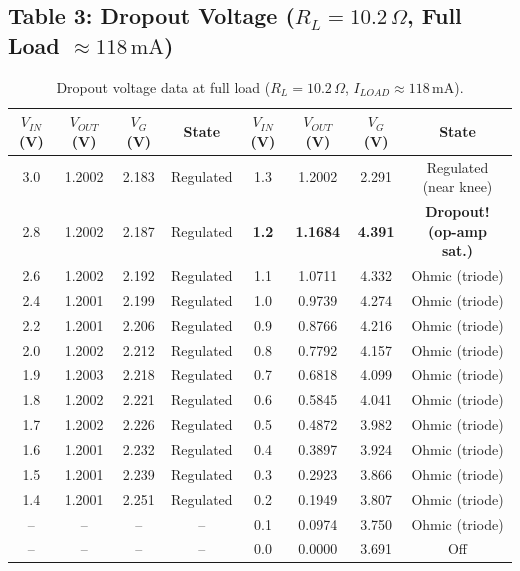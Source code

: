 \documentclass[11pt,a4paper]{article}
\begin{document}
\subsection{Table 3: Dropout Voltage ($R_L = 10.2\,\Omega$, Full Load $\approx 118\,\text{mA}$)}

\begin{table}[htbp]
\centering
\caption{Dropout voltage data at full load ($R_L = 10.2\,\Omega$, $I_{LOAD} \approx 118\,\text{mA}$).}
\label{tab:dropout}
\small
\setlength{\tabcolsep}{3.2pt}
\footnotesize
\begin{tabular}{cccc|cccc}
\toprule
\textbf{$V_{IN}$ (V)} & \textbf{$V_{OUT}$ (V)} & \textbf{$V_G$ (V)} & \textbf{State} & \textbf{$V_{IN}$ (V)} & \textbf{$V_{OUT}$ (V)} & \textbf{$V_G$ (V)} & \textbf{State} \\
\midrule
3.0 & 1.2002 & 2.183 & Regulated & 1.3 & 1.2002 & 2.291 & Regulated (near knee) \\
2.8 & 1.2002 & 2.187 & Regulated & \textbf{1.2} & \textbf{1.1684} & \textbf{4.391} & \textbf{Dropout! (op-amp sat.)} \\
2.6 & 1.2002 & 2.192 & Regulated & 1.1 & 1.0711 & 4.332 & Ohmic (triode) \\
2.4 & 1.2001 & 2.199 & Regulated & 1.0 & 0.9739 & 4.274 & Ohmic (triode) \\
2.2 & 1.2001 & 2.206 & Regulated & 0.9 & 0.8766 & 4.216 & Ohmic (triode) \\
2.0 & 1.2002 & 2.212 & Regulated & 0.8 & 0.7792 & 4.157 & Ohmic (triode) \\
1.9 & 1.2003 & 2.218 & Regulated & 0.7 & 0.6818 & 4.099 & Ohmic (triode) \\
1.8 & 1.2002 & 2.221 & Regulated & 0.6 & 0.5845 & 4.041 & Ohmic (triode) \\
1.7 & 1.2002 & 2.226 & Regulated & 0.5 & 0.4872 & 3.982 & Ohmic (triode) \\
1.6 & 1.2001 & 2.232 & Regulated & 0.4 & 0.3897 & 3.924 & Ohmic (triode) \\
1.5 & 1.2001 & 2.239 & Regulated & 0.3 & 0.2923 & 3.866 & Ohmic (triode) \\
1.4 & 1.2001 & 2.251 & Regulated & 0.2 & 0.1949 & 3.807 & Ohmic (triode) \\
-- & -- & -- & -- & 0.1 & 0.0974 & 3.750 & Ohmic (triode) \\
-- & -- & -- & -- & 0.0 & 0.0000 & 3.691 & Off \\
\bottomrule
\end{tabular}
\end{table}
\end{document}
